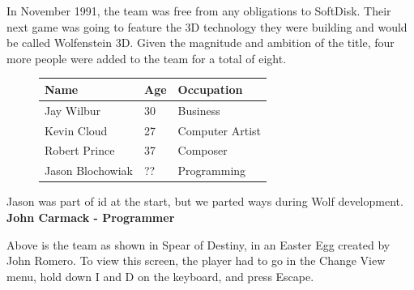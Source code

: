 \documentclass[book.tex]{subfiles}
\begin{document}
In November 1991, the team was free from any obligations to SoftDisk. Their next game was going to feature the 3D technology they were building and would be called Wolfenstein 3D. Given the magnitude and ambition of the title, four more people were added to the team for a total of eight.\\
 \begin{figure}[H]
\centering  
\begin{tabularx}{\textwidth}{ X  X  X  }
  \toprule
  \textbf{Name} &  \textbf{Age} & \textbf{Occupation} \\
  \toprule 
   Jay Wilbur & 30 &  Business\\
   Kevin Cloud\protect\footnotemark & 27 &  Computer Artist\\
   Robert Prince\protect\footnotemark & 37 &  Composer\\
   Jason Blochowiak\protect\footnotemark & ?? &   Programming\\
     \toprule
\end{tabularx}
\label{fig:Id Software hires}
\end{figure}
\addtocounter{footnote}{-2}

\begin{fancyquotes}
Jason was part of id at the start, but we parted ways during Wolf development.
 \bigskip \\
\textbf{John Carmack - Programmer}
 \end{fancyquotes}


 
\begin{figure}[H]
\centering
  
    

\label{fig:id_team_1993}
\end{figure}
\par
Above is the team as shown in Spear of Destiny, in an Easter Egg created by John Romero. To view this screen, the player had to go in the Change View menu, hold down I and D on the keyboard, and press Escape.
\end{document}
